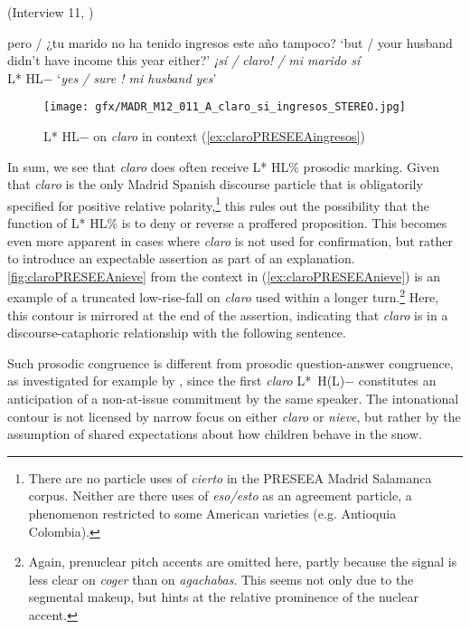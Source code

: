 \begin{exe}
\ex \label{ex:claroPRESEEAingresos} (Interview 11, \cite{PRESEEA.20142020})
	\begin{xlist}[A:]
	 pero / ¿tu marido no ha tenido ingresos este año tampoco?
	\glt `but / your husband didn't have income this year either?'
	 \textit{¡sí / claro! / mi marido sí}\\
	\hspace*{2.5em}L* HL$-$
	\glt `\textit{yes / sure ! mi husband yes}'
	 \end{xlist}
\end{exe}

\begin{figure}
	\texttt{[image: gfx/MADR\_M12\_011\_A\_claro\_si\_ingresos\_STEREO.jpg]}
	\caption{L* HL$-$ on \textit{claro} in context (\ref{ex:claroPRESEEAingresos}) \href{https://osf.io/4rknm/}{\faVolumeUp} \label{fig:claroPRESEEAingresos}}
\end{figure}

In sum, we see that \textit{claro} does often receive L* HL\% prosodic marking. Given that \textit{claro} is the only Madrid Spanish discourse particle that is obligatorily specified for positive relative polarity,\footnote{There are no particle uses of \textit{cierto} in the PRESEEA Madrid Salamanca corpus. Neither are there uses of \textit{eso/esto} as an agreement particle, a phenomenon restricted to some American varieties (e.g. Antioquia Colombia).} this rules out the possibility that the function of L* HL\% is to deny or reverse a proffered proposition. This becomes even more apparent in cases where \textit{claro} is not used for confirmation, but rather to introduce an expectable assertion as part of an explanation. \autoref{fig:claroPRESEEAnieve} from the context in (\ref{ex:claroPRESEEAnieve}) is an example of a truncated low-rise-fall on \textit{claro} used within a longer turn.\footnote{Again, prenuclear pitch accents are omitted here, partly because the signal is less clear on \textit{coger} than on \textit{agachabas}. This seems not only due to the segmental makeup, but hints at the relative prominence of the nuclear accent.} Here, this contour is mirrored at the end of the assertion, indicating that \textit{claro} is in a discourse-cataphoric relationship with the following sentence.

Such prosodic congruence is different from prosodic question-answer congruence, as investigated for example by \citet{RoettgerMahrtCole.2019}, since the first \textit{claro} L*~H(L)$-$ constitutes an anticipation of a non-at-issue commitment by the same speaker. The intonational contour is not licensed by narrow focus on either \textit{claro} or \textit{nieve}, but rather by the assumption of shared expectations about how children behave in the snow.\largerpage

